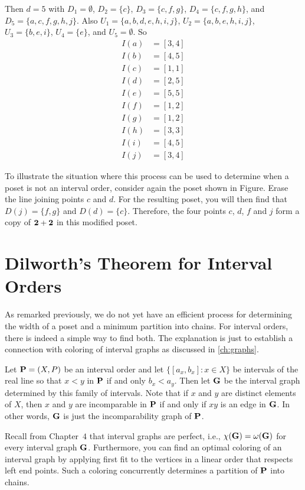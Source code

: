 Then $d= 5$ with 
$D_1=\emptyset$, $D_2=\{c\}$, $D_3=\{c,f,g\}$, $D_4=\{c,f,g,h\}$, and 
$D_5=\{a,c,f,g,h,j\}$.  Also
$U_1=\{a,b,d,e,h,i,j\}$, $U_2=\{a,b,e,h,i,j\}$,
$U_3=\{b,e,i\}$, $U_4=\{e\}$, and $U_5=\emptyset$.
So
\begin{align*}
I(a) &= [3,4]\\
I(b) &= [4,5]\\
I(c) &= [1,1]\\
I(d) &= [2,5]\\
I(e) &= [5,5]\\
I(f) &= [1,2]\\
I(g) &= [1,2]\\
I(h) &= [3,3]\\
I(i) &= [4,5]\\
I(j) &= [3,4]
\end{align*}

To illustrate the situation where this process can be used to
determine when a poset is not an interval order, consider again the
poset shown in Figure.  Erase the line joining points $c$ and $d$.
For the resulting poset,  you will then find that $D(j)=\{f,g\}$
and $D(d)=\{c\}$.  Therefore, the four points $c$, $d$, $f$ and $j$
form a copy of $\mathbf{2}+\mathbf{2}$ in this modified poset.

\section{Dilworth's Theorem for Interval Orders}\label{s:posets:dilworth-intord}

As remarked previously, we do not yet have an efficient
process for determining the width of a poset and a minimum
partition into chains.  For interval orders, there is indeed
a simple way to find both. The explanation is just to establish
a connection with coloring of interval graphs as discussed in
\autoref{ch:graphs}.

Let $\mathbf{P}=(X,P)$ be an interval order and let 
$\{[a_x,b_x]:x\in X\}$ be intervals of the real line
so that $x<y$ in $\mathbf{P}$ if and only $b_x<a_y$.
Then let $\mathbf{G}$ be the interval graph determined by this
family of intervals.  Note that if $x$ and $y$ are distinct
elements of $X$, then $x$ and $y$ are incomparable in $\mathbf{P}$ if and
only if $xy$ is an edge in $\mathbf{G}$.  In other words, $\mathbf{G}$ is
just the incomparability graph of $\mathbf{P}$.

Recall from Chapter~$4$ that interval graphs are perfect, i.e.,
$\chi(\mathbf{G})=\omega(\mathbf{G})$ for every interval graph $\mathbf{G}$.  Furthermore,
you can find an optimal coloring of an interval graph by applying first fit
to the vertices in a linear order that respects left end points.
Such a coloring concurrently determines a partition of $\mathbf{P}$ into
chains.

